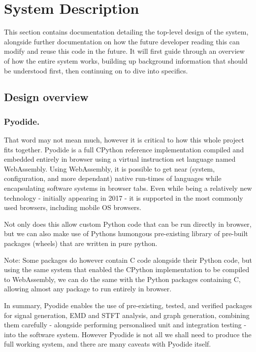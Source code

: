 \section{System Description}

This section contains documentation detailing the top-level design of the system, alongside further documentation on how the future developer reading this
can modify and reuse this code in the future. It will first guide through an overview of how the entire system works, 
building up background information that should be understood first, then continuing on to dive into specifics.

\subsection{Design overview}

\subsubsection{Pyodide.}

That word may not mean much, however it is critical to how this whole project fits together. 
Pyodide is a full CPython reference implementation 
compiled and embedded entirely in browser using a virtual instruction set language named WebAssembly. Using WebAssembly, it is possible to get near (system, configuration, and more dependant)
native run-times of languages while encapsulating software systems in browser tabs. Even while being a relatively new 
technology - initially appearing in 2017 \cite{10.1145/3062341.3062363} - it 
is supported in the most commonly used browsers, including mobile OS browsers. 

Not only does this allow custom Python code that can be run directly in browser, but we can also make
use of Pythons humongous pre-existing library of pre-built packages (wheels) that are written in pure python. 

Note: Some packages do however contain C code alongside their Python code, but using the same system that enabled the CPython implementation to be compiled to WebAssembly,
we can do the same with the Python packages containing C, allowing almost any package to run entirely in browser.

In summary, Pyodide enables the use of pre-existing, tested, and verified packages for signal generation, EMD and STFT analysis, and graph generation, combining them carefully 
- alongside performing personalised unit and integration testing - into the software system. 
However Pyodide is not all we shall need to produce the full working system, and there are many caveats with Pyodide itself.


